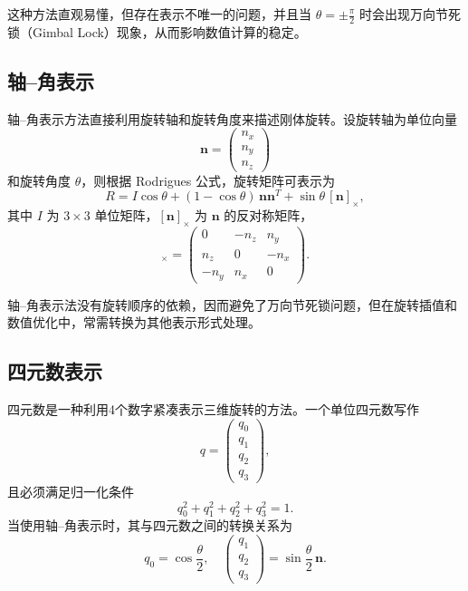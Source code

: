 这种方法直观易懂，但存在表示不唯一的问题，并且当 $\theta = \pm \frac{\pi}{2}$ 时会出现万向节死锁（Gimbal Lock）现象，从而影响数值计算的稳定。

\subsection{轴–角表示}

轴–角表示方法直接利用旋转轴和旋转角度来描述刚体旋转。设旋转轴为单位向量 
\[
\mathbf{n} = \begin{pmatrix} n_x \\ n_y \\ n_z \end{pmatrix}
\]
和旋转角度 $\theta$，则根据 Rodrigues 公式，旋转矩阵可表示为
\begin{equation}
	R = I \cos\theta + (1-\cos\theta)\, \mathbf{n}\mathbf{n}^T + \sin\theta \, [\mathbf{n}]_\times,
\end{equation}
其中 $I$ 为 $3\times 3$ 单位矩阵，$[\mathbf{n}]_\times$ 为 $\mathbf{n}$ 的反对称矩阵，
\begin{equation}
	[\mathbf{n}]_\times = \begin{pmatrix}
		0 & -n_z & n_y \\
		n_z & 0 & -n_x \\
		-n_y & n_x & 0
	\end{pmatrix}.
\end{equation}

轴–角表示法没有旋转顺序的依赖，因而避免了万向节死锁问题，但在旋转插值和数值优化中，常需转换为其他表示形式处理。

\subsection{四元数表示}

四元数是一种利用4个数字紧凑表示三维旋转的方法。一个单位四元数写作
\begin{equation}
	q = \begin{pmatrix} q_0 \\ q_1 \\ q_2 \\ q_3 \end{pmatrix},
\end{equation}
且必须满足归一化条件
\begin{equation}
	q_0^2 + q_1^2 + q_2^2 + q_3^2 = 1.
\end{equation}
当使用轴–角表示时，其与四元数之间的转换关系为
\begin{equation}
	q_0 = \cos\frac{\theta}{2}, \quad \begin{pmatrix} q_1 \\ q_2 \\ q_3 \end{pmatrix} = \sin\frac{\theta}{2}\, \mathbf{n}.
\end{equation}

